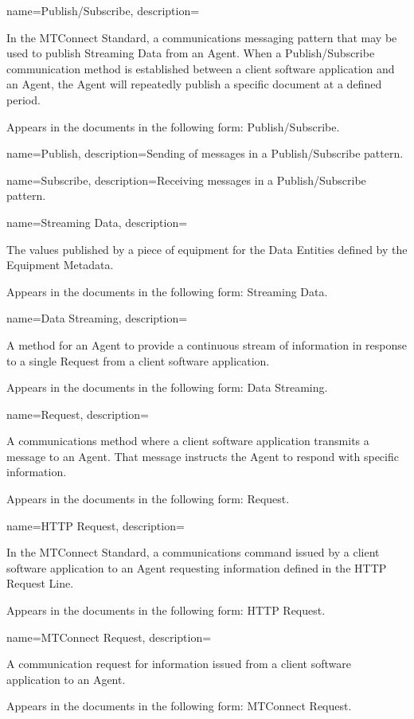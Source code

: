 {
    name={Publish/Subscribe},
	description={
	In the MTConnect Standard, a communications messaging pattern that may be used to publish \gls{Streaming Data} from an \gls{Agent}.  When a \gls{Publish/Subscribe} communication method is established between a client software application and an \gls{Agent}, the \gls{Agent} will repeatedly publish a specific  document at a defined period.

	Appears in the documents in the following form: \gls{Publish/Subscribe}.
}
}

{
    name={Publish},
	description={Sending of messages in a \gls{Publish/Subscribe} pattern.}
}

{
    name={Subscribe},
	description={Receiving messages in a \gls{Publish/Subscribe} pattern.}
}

{
    name={Streaming Data},
	description={
	The values published by a piece of equipment for the \gls{Data Entities} defined by the \gls{Equipment Metadata}.

	Appears in the documents in the following form: \gls{Streaming Data}.
}
}

{
    name={Data Streaming},
	description={
	A method for an \gls{Agent} to provide a continuous stream of information in response to a single \gls{Request} from a client software application.

	Appears in the documents in the following form: \gls{Data Streaming}.
}
}

{
    name={Request},
	description={
	A communications method where a client software application transmits a message to an \gls{Agent}.  That message instructs the \gls{Agent} to respond with specific information.

	Appears in the documents in the following form: \gls{Request}.
}
}

{
    name={HTTP Request},
	description={
	In the MTConnect Standard, a communications command issued by a client software application to an \gls{Agent} requesting information defined in the \gls{HTTP Request Line}.

	Appears in the documents in the following form: \gls{HTTP Request}.
}
}

{
    name={MTConnect Request},
	description={
	A communication request for information issued from a client software application to an \gls{Agent}.

	Appears in the documents in the following form: \gls{MTConnect Request}.
}
}

